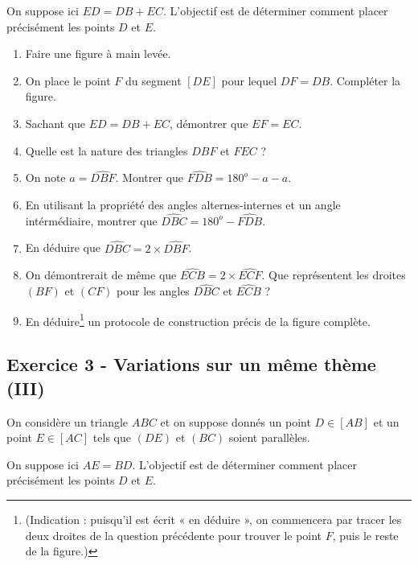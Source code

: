 \documentclass[12 pt]{extarticle}
\theoremstyle{plain}
\begin{document}
On suppose ici $ED=DB+EC$. L'objectif est de déterminer comment placer précisément les points $D$ et $E$. 

\begin{enumerate}
\item Faire une figure à main levée.

\item On place le point $F$ du segment $[DE]$ pour lequel $DF= DB$. 
Compléter la figure. 

\item Sachant que $ED=DB+EC$, démontrer que $EF= EC$. 

\item Quelle est la nature des triangles $DBF$ et $FEC$ ? 

\item On note $a = \widehat{DBF}$. Montrer que $\widehat{FDB}= 180^o-a-a$. 

\item En utilisant la propriété des angles alternes-internes et un angle intérmédiaire, montrer que $\widehat{DBC}=180^o-\widehat{FDB}$. 

\item En déduire que $\widehat{DBC}= 2 \times \widehat{DBF}$. 

\item On démontrerait de même que $\widehat{ECB}= 2 \times \widehat{ECF}$. Que représentent les droites $(BF)$ et $(CF)$ pour 
les angles $\widehat{DBC}$ et $\widehat{ECB}$ ? 

\item En déduire\footnote{(Indication : puisqu'il est écrit « en déduire », on commencera par tracer les deux droites de la question précédente pour trouver le point $F$, puis le reste de la figure.)} un protocole de construction précis de la figure complète.

\end{enumerate}


\subsection*{Exercice 3 - Variations sur un même thème (III)}

On considère un triangle $ABC$ et on suppose donnés un point $D\in[AB]$ et un point $E\in[AC]$ tels que $(DE)$ et $(BC)$ soient parallèles. 

On suppose ici $AE = BD$. L'objectif est de déterminer comment placer précisément les points $D$ et $E$. 
\end{document}

